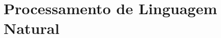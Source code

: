 \documentclass{automatextcc}
\begin{document}
\section{Processamento de Linguagem Natural}
\end{document}
